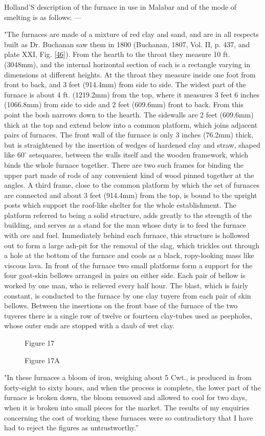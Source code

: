Holland’S description of the furnace in use in Malabar and of the mode of smelting is as follows: — 

"The furnaces are made of a mixture of red clay and sand, and are in all respects built as Dr. Buchanan saw them in 1800 (Buchanan, 1807, Vol. II, p. 437, and plate XXI, Fig. \ref{46}). From the hearth to the throat they measure 10 ft. (3048mm), and the internal horizontal section of each is a rectangle varying in dimensions at different heights. At the throat they measure inside one foot from front to back, and 3 feet (914.4mm) from side to side. The widest part of the furnace is about 4 ft. (1219.2mm) from the top, where it measures 3 feet 6 inches (1066.8mm) from side to side and 2 feet (609.6mm) front to back. From this point the bosh narrows down to the hearth. The sidewalls are 2 feet (609.6mm) thick at the top and extend below into a common platform, which joins adjacent pairs of furnaces. The front wall of the furnace is only 3 inches (76.2mm) thick, but is straightened by the insertion of wedges of hardened clay and straw, shaped like $60^\circ$ setsquares, between the walls itself and the wooden framework, which binds the whole furnace together. There are two such frames for binding the upper part made of rods of any convenient kind of wood pinned together at the angles. A third frame, close to the common platform by which the set of furnaces are connected and about 3 feet (914.4mm) from the top, is bound to the upright posts which support the roof-like shelter for the whole establishment. The platform referred to being a solid structure, adds greatly to the strength of the building, and serves as a stand for the man whose duty is to feed the furnace with ore and fuel. Immediately behind each furnace, this structure is hollowed out to form a large ash-pit for the removal of the slag, which trickles out through a hole at the bottom of the furnace and cools as a black, ropy-looking mass like viscous lava. In front of the furnace two small platforms form a support for the four goat-skin bellows arranged in pairs on either side. Each pair of bellow is worked by one man, who is relieved every half hour. The blast, which is fairly constant, is conducted to the furnace by one clay tuyere from each pair of skin bellows. Between the insertions on the front base of the furnace of the two tuyeres there is a single row of twelve or fourteen clay-tubes used as peepholes, whose outer ends are stopped with a daub of wet clay.
\begin{figure}[H]
\centerline{Figure 17}
\end{figure}
\begin{figure}[H]
\centerline{Figure 17A}
\end{figure}
"In these furnaces a bloom of iron, weighing about 5 Cwt., is produced in from forty-eight to sixty hours, and when the process is complete, the lower part of the furnace is broken down, the bloom removed and allowed to cool for two days, when it is broken into small pieces for the market. The results of my enquiries concerning the cost of working these furnaces were so contradictory that I have had to reject the figures as untrustworthy.”

